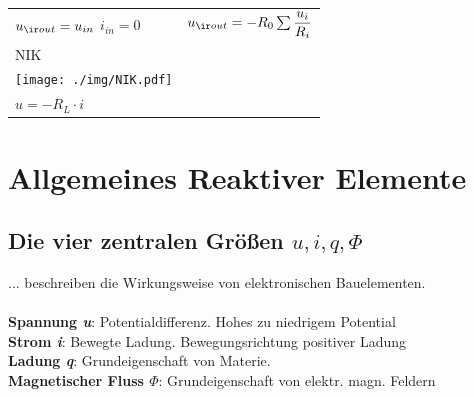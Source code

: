 \documentclass[fs, footer]{latex4ei}
\begin{document}
\begin{multicols*}{4}
\begin{tabular}{ll}
        $u_{\ir out} = u_{in}$ \quad $i_{in} = 0$                & $u_{\ir out} = -R_0 \sum \frac{u_i}{R_i}$                            \\ \mrule
        NIK                                                      &                                                                      \\
        \texttt{[image: ./img/NIK.pdf]}             &                                                                      \\
        $u = -R_L \cdot i$                                                                                                              \\
    \end{tabular}


    \section{Allgemeines Reaktiver Elemente}

    \subsection{Die vier zentralen Größen $u,i,q,\Phi$}
    ... beschreiben die Wirkungsweise von elektronischen Bauelementen.\\ \\
    \textbf{Spannung \textit{u}}: Potentialdifferenz. Hohes zu niedrigem Potential\\
    \textbf{Strom \textit{i}}: Bewegte Ladung. Bewegungsrichtung positiver Ladung\\
    \textbf{Ladung \textit{q}}: Grundeigenschaft von Materie.\\
    \textbf{Magnetischer Fluss \textit{$\Phi$}}: Grundeigenschaft von elektr. magn. Feldern\\

\end{multicols*}
\end{document}
